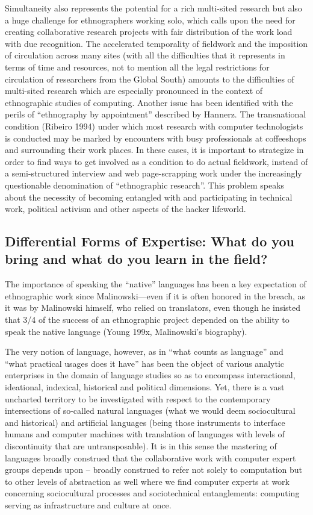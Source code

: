 \documentclass[10pt,letter,oneside]{scrartcl}
\begin{document}
Simultaneity also represents the potential for a rich multi-sited
research but also a huge challenge for ethnographers working solo,
which calls upon the need for creating collaborative research projects 
with fair distribution of the work load with due recognition. 
The accelerated temporality of fieldwork and the imposition of 
circulation across many sites (with all the difficulties that it 
represents in terms of time and resources, not to mention all the
legal restrictions for circulation of researchers from the Global 
South) amounts to the difficulties of multi-sited research which are 
especially pronounced in the context of ethnographic studies of computing.
Another issue has been identified with the perils of ``ethnography by appointment'' 
described by Hannerz. The transnational condition (Ribeiro 1994) under which 
most research with computer technologists is conducted may be marked by 
encounters with busy professionals at coffeeshops and surrounding their work 
places. In these cases, it is important to strategize in order to find ways 
to get involved as a condition to do actual fieldwork, instead of a semi-structured 
interview and web page-scrapping work under the increasingly questionable 
denomination of ``ethnographic research''. This problem speaks about the 
necessity of becoming entangled with and participating in technical work, 
political activism and other aspects of the hacker lifeworld.


\subsection{Differential Forms of Expertise: What do you bring and what
do you learn in the field?} 

The importance of speaking the ``native'' languages has been a key
expectation of ethnographic work since Malinowski---even if it is
often honored in the breach, as it was by Malinowski himself, who
relied on translators, even though he insisted that 3/4 of the 
success of an ethnographic project depended on the ability to 
speak the native language (Young 199x, Malinowski's biography).
 
The very notion of language, however, as in ``what counts as
language'' and ``what practical usages does it have'' has been the
object of various analytic enterprises in the domain of language
studies so as to encompass interactional, ideational, indexical,
historical and political dimensions. Yet, there is a vast uncharted 
territory to be investigated with respect to the contemporary 
intersections of so-called natural languages (what we would 
deem sociocultural and historical) and artificial languages 
(being those instruments to interface humans and computer machines
with translation of languages with levels of discontinuity that are
untransposable). It is in this sense the mastering of languages 
broadly construed that the collaborative work with computer expert 
groups depends upon -- broadly construed to refer not solely to 
computation but to other levels of abstraction as well where 
we find computer experts at work concerning sociocultural processes
and sociotechnical entanglements: computing serving as infrastructure 
and culture at once. 
\end{document}
